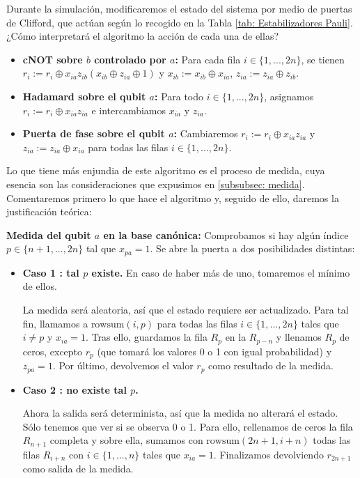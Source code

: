 \documentclass[11pt,a4paper,twoside,pdf]{article}
\numberwithin{equation}{section}
\begin{document}
	Durante la simulación, modificaremos el estado del sistema por medio de puertas de Clifford, que actúan según lo recogido en la Tabla \ref{tab: Estabilizadores Pauli}. ¿Cómo interpretará el algoritmo la acción de cada una de ellas?
			
			\begin{itemize}
				\item \textbf{cNOT sobre $b$ controlado por $a$:} Para cada fila $i \in \{1,...,2n\}$, se tienen $r_i := r_i \oplus x_{ia}z_{ib}(x_{ib} \oplus z_{ia} \oplus 1)$ y $x_{ib}:=x_{ib}\oplus x_{ia}$, $z_{ia} := z_{ia} \oplus z_{ib}$.
				
				\item \textbf{Hadamard sobre el qubit $a$:} Para todo $i \in \{1,...,2n\}$, asignamos $r_i := r_i \oplus x_{ia}z_{ia}$ e intercambiamos $x_{ia}$ y $z_{ia}$.
				
				\item \textbf{Puerta de fase sobre el qubit $a$:} Cambiaremos $r_i := r_i \oplus x_{ia}z_{ia}$ y  $z_{ia} := z_{ia} \oplus x_{ia}$ para todas las filas $i\in\{1,...,2n\}$.
			\end{itemize}	
	
		
	Lo que tiene más enjundia de este algoritmo es el proceso de medida, cuya esencia son las consideraciones que expusimos en \ref{subsubsec: medida}. Comentaremos primero lo que hace el algoritmo y, seguido de ello, daremos la justificación teórica:
		
	\textbf{Medida del qubit $a$ en la base canónica:} Comprobamos si hay algún índice $p \in \{n+1,..., 2n\}$ tal que $x_{pa}=1$. Se abre la puerta a dos posibilidades distintas:
			
			\begin{itemize}[leftmargin=0.6cm]
				
				\item[] \textbf{Caso 1 : tal $p$ existe.} En caso de haber más de uno, tomaremos el mínimo de ellos.
					
					La medida será aleatoria, así que el estado requiere ser actualizado. Para tal fin, llamamos a $\text{rowsum}(i,p)$ para todas las filas $i \in \{1,...,2n\}$ tales que $i\ne p$ y $x_{ia}=1$. Tras ello, guardamos la fila $R_{p}$ en la $R_{p-n}$ y llenamos $R_p$ de ceros, excepto $r_p$ (que tomará los valores 0 o 1 con igual probabilidad) y $z_{pa}=1$. Por último, devolvemos el valor $r_p$ como resultado de la medida.
							
				\item[] \textbf{Caso 2 : no existe tal $p$.}
				
					Ahora la salida será determinista, así que la medida no alterará el estado. Sólo tenemos que ver si se observa 0 o 1. Para ello, rellenamos de ceros la fila $R_{n+1}$ completa y sobre ella, sumamos con $\text{rowsum}(2n+1,i+n)$ todas las filas $R_{i+n}$ con $i\in\{1,...,n\}$ tales que $x_{ia}=1$. Finalizamos devolviendo $r_{2n+1}$ como salida de la medida.
				
			\end{itemize}
		
\end{document}
